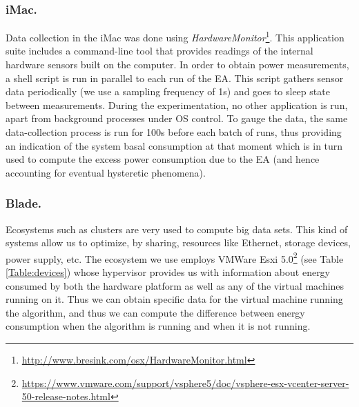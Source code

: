\subsubsection*{iMac.}
Data collection in the iMac was done using \emph{HardwareMonitor}\footnote{\url{http://www.bresink.com/osx/HardwareMonitor.html}}. 
This application suite includes a command-line tool that provides readings of the internal
hardware sensors built on the computer. In order to obtain power measurements, a shell
script is run in parallel to each run of the EA. This script gathers sensor data periodically
(we use a sampling frequency of 1s) and goes to sleep state between measurements. 
During the experimentation, no other application is run, apart from background processes 
under OS control. 
To gauge the data,
the same data-collection process is run for 100s before each batch of runs, thus providing
an indication of the system basal consumption at that moment which is in turn used to 
compute the excess power consumption due to the EA (and hence accounting for
eventual hysteretic phenomena).

\subsubsection*{Blade.}

Ecosystems such as clusters are very used to compute big data sets. This kind of systems allow us to optimize, by sharing, resources like Ethernet, storage devices, power supply, etc. %
The ecosystem we use employs VMWare Esxi 5.0\footnote{\url{https://www.vmware.com/support/vsphere5/doc/vsphere-esx-vcenter-server-50-release-notes.html}} (see Table \ref{Table:devices}) whose hypervisor provides us with information about energy consumed by both the hardware platform as well as any of the virtual machines running on it.  Thus we can obtain specific data for the virtual machine running the algorithm, and thus we can compute the difference between energy consumption when the algorithm is running and when it is not running.  


